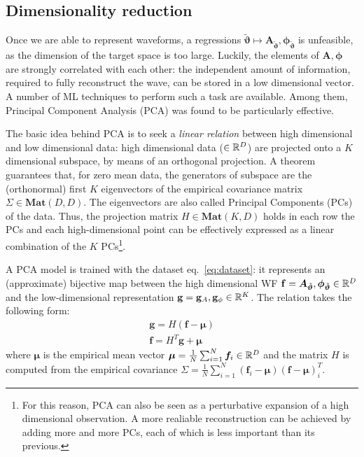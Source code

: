 \subsection{Dimensionality reduction}
Once we are able to represent waveforms, a regressions ${\tilde{\boldsymbol{\vartheta}}} \longmapsto \boldsymbol{A}_{{\tilde{\boldsymbol{\vartheta}}}}, \boldsymbol{\phi}_{{\tilde{\boldsymbol{\vartheta}}}}$ is unfeasible, as the dimension of the target space is too large. Luckily, the elements of $\boldsymbol{A}, \boldsymbol{\phi}$ are strongly correlated with each other: the independent amount of information, required to fully reconstruct the wave, can be stored in a low dimensional vector.
A number of ML techniques to perform such a task are available. Among them, Principal Component Analysis (PCA) \cite[ch. 12]{murphy2012machine} was found to be particularly effective.
\par
The basic idea behind PCA is to seek a \textit{linear relation} between high dimensional and low dimensional data: high dimensional data ($\in \mathbb{R}^D$) are projected onto a $K$ dimensional subspace, by means of an orthogonal projection.
A theorem guarantees that, for zero mean data, the generators of subspace are the (orthonormal) first $K$ eigenvectors of the empirical covariance matrix $\Sigma \in \mathbf{Mat}(D,D)$. The eigenvectors are also called Principal Components (PCs) of the data.
Thus, the projection matrix $H\in \mathbf{Mat}(K,D)$ holds in each row the PCs and each high-dimensional point can be effectively expressed as a linear combination of the $K$ PCs\footnote{For this reason, PCA can also be seen as a perturbative expansion of a high dimensional observation. A more realiable reconstruction can be achieved by adding more and more PCs, each of which is less important than its previous.}.
\par
A PCA model is trained with the dataset eq.~\eqref{eq:dataset}: it represents an (approximate) bijective map between the high dimensional WF $\mathbf{f} = \boldsymbol{A}_{\tilde{\boldsymbol{\vartheta}}}, \boldsymbol{\phi}_{\tilde{\boldsymbol{\vartheta}}} \in \mathbb{R}^D$ and the low-dimensional representation $\mathbf{g} = \mathbf{g}_A , \mathbf{g}_\phi \in \mathbb{R}^K$.
The relation takes the following form:
\begin{align}
	\mathbf{g} = H (\mathbf{f} - \boldsymbol{\mu}) \label{eq:PCA_reduction_model}\\
	\mathbf{f} = H^T \mathbf{g} + \boldsymbol{\mu} \label{eq:PCA_reconstruction_model}
\end{align}
where $\boldsymbol{\mu}$ is the empirical mean vector ${\boldsymbol{\mu} = \frac{1}{N} \sum_{i=1}^N \boldsymbol{f}_i \in \mathbb{R}^D}$ and the matrix $H$ is computed from the empirical covariance ${\Sigma = \frac{1}{N} \sum_{i=1}^N (\mathbf{f}_i-\boldsymbol{\mu}) (\mathbf{f}-\boldsymbol{\mu})^T_i}$.
\par

